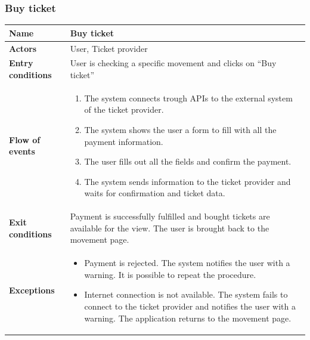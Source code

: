 \subsubsection{Buy ticket}
\begin{table}[!h]
	\centering
	{\renewcommand{\arraystretch}{2}%
		\begin{tabular}{|l|p{12cm}|}
			\hline
			\textbf{Name} 				& \textbf{Buy ticket} \\ \hline
			\textbf{Actors} 			& User, Ticket provider \\ \hline
			\textbf{Entry conditions} 	& User is checking a specific movement and clicks on “Buy ticket” \\ \hline
			\textbf{Flow of events}		& \begin{minipage}[t]{0.75\textwidth}
				\begin{enumerate}
					\item The system connects trough APIs to the external system of the ticket provider.
					\item The system shows the user a form to fill with all the payment information.
					\item The user fills out all the fields and confirm the payment.
					\item The system sends information to the ticket provider and waits for confirmation and ticket data.
				\end{enumerate}
			\end{minipage}	\\ \hline
			\textbf{Exit conditions}	& Payment is successfully fulfilled and bought tickets are available for the view. The user is brought back to the movement page.  \\ \hline
			\textbf{Exceptions}			& \begin{minipage}[t]{0.75\textwidth}
				\begin{itemize}
					\item Payment is rejected. The system notifies the user with a warning. It is possible to repeat the procedure. 
					\item Internet connection is not available. The system fails to connect to the ticket provider and notifies the user with a warning. The application returns to the movement page.
				\end{itemize} 
			\end{minipage} \\ \hline
	\end{tabular}}
\end{table}
\clearpage

